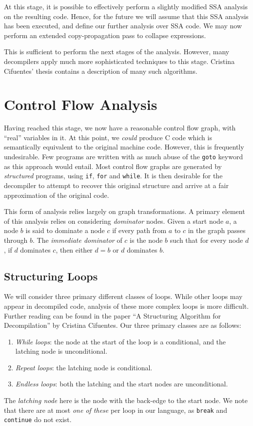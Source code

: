 \documentclass{article}
\begin{document}
At this stage, it is possible to effectively perform a slightly modified SSA analysis
on the resulting code. Hence, for the future we will assume that this SSA analysis has been
executed, and define our further analysis over SSA code.
We may now perform an extended copy-propagation pass to collapse expressions.

This is sufficient to perform the next stages of the analysis. However, many decompilers
apply much more sophisticated techniques to this stage. Cristina Cifuentes' thesis contains
a description of many such algorithms.

\section{Control Flow Analysis}
Having reached this stage, we now have a reasonable control flow graph, with ``real'' variables
in it. At this point, we {\em could} produce C code which is semantically equivalent to the
original machine code. However, this is frequently undesirable. Few programs are written with
as much abuse of the \verb+goto+ keyword as this approach would entail. Most control flow graphs
are generated by {\em structured} programs, using \verb+if+, \verb+for+ and \verb+while+. It
is then desirable for the decompiler to attempt to recover this original structure and arrive
at a fair approximation of the original code.

This form of analysis relies largely on graph transformations. A primary element of this analysis
relies on considering {\em dominator} nodes. Given a start node $a$, a node $b$ is said to 
dominate a node $c$ if every path from $a$ to $c$ in the graph passes through $b$. The 
{\em immediate dominator} of $c$ is the node $b$ such that for every node $d$, if $d$ dominates
$c$, then either $d = b$ or $d$ dominates $b$.

\subsection{Structuring Loops}
We will consider three primary different classes of loops. While other loops may appear
in decompiled code, analysis of these more complex loops is more difficult. Further reading can
be found in the paper ``A Structuring Algorithm for Decompilation'' by Cristina Cifuentes.
Our three primary classes are as follows:
\begin{enumerate}
\item {\em While loops}: the node at the start of the loop is a conditional,
	and the latching node is unconditional.
\item {\em Repeat loops}: the latching node is conditional.
\item {\em Endless loops}: both the latching and the start nodes are unconditional.
\end{enumerate}
The {\em latching node} here is the node with the back-edge to the start node.
We note that there are at most {\em one of these} per loop in our language, as \verb+break+
and \verb+continue+ do not exist.
\end{document}
